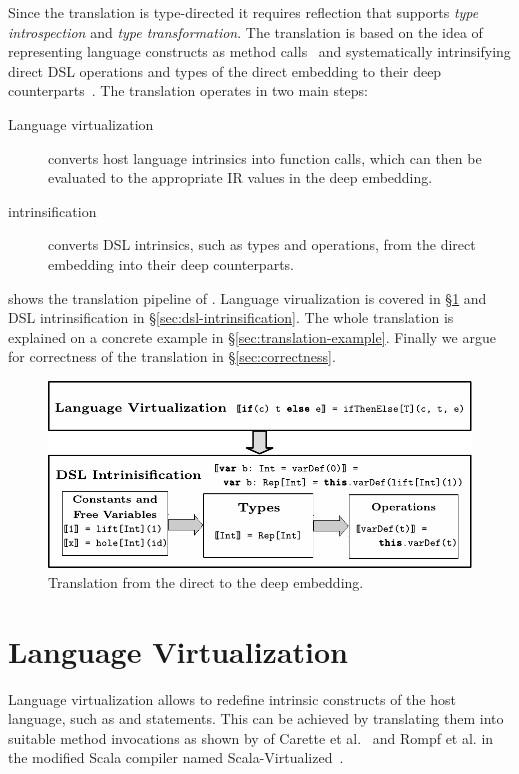 Since the translation is type-directed it requires reflection that supports
 \emph{type introspection} and \emph{type transformation}. The translation is based on the idea of representing language constructs as method calls~\cite{carette_finally_2009,rompf_scala-virtualized:_2009} and systematically intrinsifying direct DSL operations and types of the direct embedding to their deep counterparts~\cite{carette_finally_2009}. The translation operates in two main steps:
\begin{description}
\item[Language virtualization] converts host language intrinsics into
  function calls, which can then be evaluated to the appropriate IR
  values in the deep embedding.
\item[\edsl{} intrinsification] converts DSL intrinsics, such as types and operations,
 from the direct embedding into their deep counterparts.
\end{description}

 shows the translation pipeline of \yy. Language virualization is covered
in \S \ref{sec:langauge-virtualization} and DSL intrinsification
in \S \ref{sec:dsl-intrinsification}. The whole translation is explained on a concrete example
in \S \ref{sec:translation-example}. Finally we argue for correctness of the translation
in \S \ref{sec:correctness}.

\begin{figure}[!ht]
\centering
\includegraphics{diagrams/pipeline.pdf}
\caption{Translation from the direct to the deep embedding.}
\label{fig:pipeline}
\end{figure}


\section{Language Virtualization}
\label{sec:langauge-virtualization}
Language virtualization allows to redefine intrinsic constructs of the
host language, such as  and  statements. This can be
achieved by translating them into suitable method invocations as shown by of Carette et al.~\cite{carette_finally_2009} and Rompf et al. in the modified Scala compiler named Scala-Virtualized~\cite{rompf_scala-virtualized:_2009}.

